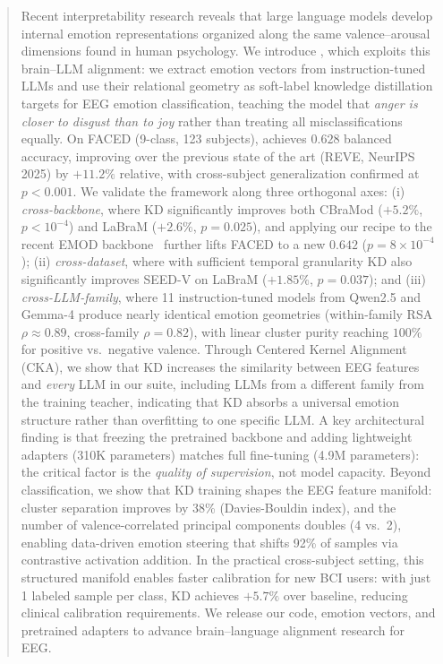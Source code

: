 \begin{abstract}
\label{sec:abstract-sec}
Recent interpretability research reveals that large language models develop internal emotion representations organized along the same valence--arousal dimensions found in human psychology.
We introduce \textbf{\ours}, which exploits this brain--LLM alignment: we extract emotion vectors from instruction-tuned LLMs and use their relational geometry as soft-label knowledge distillation targets for EEG emotion classification, teaching the model that \emph{anger is closer to disgust than to joy} rather than treating all misclassifications equally.
On FACED (9-class, 123 subjects), \ours achieves \(\mathbf{0.628}\) balanced accuracy, improving over the previous state of the art (REVE, NeurIPS 2025) by \(\mathbf{+11.2\%}\) relative, with cross-subject generalization confirmed at $p < 0.001$.
We validate the framework along three orthogonal axes: (i) \emph{cross-backbone}, where KD significantly improves both CBraMod (\(\mathbf{+5.2\%}\), $p < 10^{-4}$) and LaBraM (\(\mathbf{+2.6\%}\), $p = 0.025$), and applying our recipe to the recent EMOD backbone~\cite{emod2026} further lifts FACED to a new \(\mathbf{0.642}\) ($p = 8 \times 10^{-4}$); (ii) \emph{cross-dataset}, where with sufficient temporal granularity KD also significantly improves SEED-V on LaBraM (\(\mathbf{+1.85\%}\), $p = 0.037$); and (iii) \emph{cross-LLM-family}, where 11 instruction-tuned models from Qwen2.5 and Gemma-4 produce nearly identical emotion geometries (within-family RSA $\rho \approx 0.89$, cross-family $\rho = 0.82$), with linear cluster purity reaching $100\%$ for positive vs.\ negative valence.
Through Centered Kernel Alignment (CKA), we show that KD increases the similarity between EEG features and \emph{every} LLM in our suite, including LLMs from a different family from the training teacher, indicating that KD absorbs a universal emotion structure rather than overfitting to one specific LLM.
A key architectural finding is that freezing the pretrained backbone and adding lightweight adapters (310K parameters) matches full fine-tuning (4.9M parameters): the critical factor is the \emph{quality of supervision}, not model capacity.
Beyond classification, we show that KD training shapes the EEG feature manifold: cluster separation improves by 38\% (Davies-Bouldin index), and the number of valence-correlated principal components doubles (4 vs.\ 2), enabling data-driven emotion steering that shifts 92\% of samples via contrastive activation addition. In the practical cross-subject setting, this structured manifold enables faster calibration for new BCI users: with just 1 labeled sample per class, KD achieves $+5.7\%$ over baseline, reducing clinical calibration requirements.
We release our code, emotion vectors, and pretrained adapters to advance brain--language alignment research for EEG.
\end{abstract}
